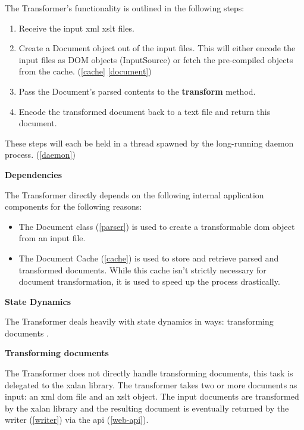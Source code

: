 The Transformer's functionality is outlined in the following steps:

\begin{enumerate}
  \item Receive the input \gls{xml} \gls{xslt} files.
  \item Create a Document object out of the input files. This will either encode the input files as DOM objects (InputSource) or fetch the pre-compiled objects from the cache. (\ref{cache} \ref{document})
  \item Pass the Document's parsed contents to the \cite{xalan-library} \textbf{transform} method.
  \item Encode the transformed document back to a text file and return this document.
\end{enumerate}

These steps will each be held in a thread spawned by the long-running daemon process. (\ref{daemon})

\textbf{Dependencies}

The Transformer directly depends on the following internal application components for the following reasons:

\begin{itemize}
  \item {
      The Document class (\ref{parser}) is used to create a transformable \gls{dom} object from an input file. \cite{dom-spec}
  }
  \item {
    The Document Cache (\ref{cache}) is used to store and retrieve parsed and transformed documents.
    While this cache isn't strictly necessary for document transformation, it is used to speed up the process drastically.
  }
\end{itemize}

\textbf{State Dynamics}

The Transformer deals heavily with state dynamics in ways: transforming documents .

\textbf{Transforming documents}

The Transformer does not directly handle transforming documents, this task is delegated to the \gls{xalan} library. \cite{xalan-library}
The transformer takes two or more documents as input: an \gls{xml} \gls{dom} file and an \gls{xslt} object.
The input documents are transformed by the \gls{xalan} library and the resulting document is eventually returned by the writer (\ref{writer}) via the \gls{api} (\ref{web-api}).


